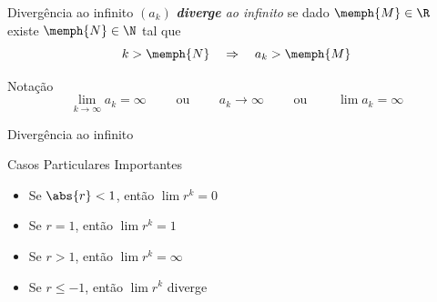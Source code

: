 \begin{frame}{Divergência ao infinito}
    $(a_k)$ \emph{\textbf{diverge} ao infinito} se dado
    $\memph{M}\in\R$ existe $\memph{N}\in\N$ tal que
    \[
      k > \memph{N} \quad \Rightarrow \quad a_k > \memph{M}
    \]

    \pause
    \vspace{\baselineskip}
    Notação
    \[ \lim_{k\to\infty} a_k=\infty
    \qquad\text{ ou }\qquad
    a_k\to \infty
    \qquad\text{ ou }\qquad
    \lim a_k=\infty
    \]

\end{frame}

\begin{frame}{Divergência ao infinito}
  \centering
  \scalebox{0.9}{}
\end{frame}

\begin{frame}{Casos Particulares Importantes}
  \begin{itemize}[<+->]
    \setlength\itemsep{1.5em}
    \item Se $\abs{r}<1$, \tabto{25mm} então \(\lim r^k=0\)
    \item Se $r = 1$,     \tabto{25mm} então \(\lim r^k=1\)
    \item Se $r > 1$,     \tabto{25mm} então \(\lim r^k=\infty\)
    \item Se $r \leq -1$, \tabto{25mm} então \(\lim r^k\) diverge
  \end{itemize}
\end{frame}

